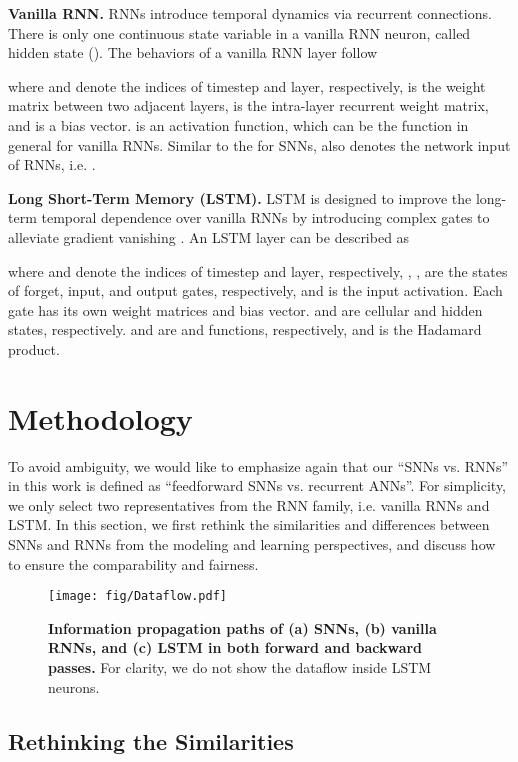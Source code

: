 \documentclass[journal,10pt,twocolumn]{IEEETran}
\begin{document}
\textbf{Vanilla RNN.} RNNs introduce temporal dynamics via recurrent connections. There is only one continuous state variable in a vanilla RNN neuron, called hidden state (). The behaviors of a vanilla RNN layer follow

where  and  denote the indices of timestep and layer, respectively,  is the weight matrix between two adjacent layers,  is the intra-layer recurrent weight matrix, and  is a bias vector.  is an activation function, which can be the  function in general for vanilla RNNs. Similar to the  for SNNs,  also denotes the network input of RNNs, i.e. .

\textbf{Long Short-Term Memory (LSTM).} LSTM is designed to improve the long-term temporal dependence over vanilla RNNs by introducing complex gates to alleviate gradient vanishing \cite{hochreiter1997long,gers1999learning}. An LSTM layer can be described as

where  and  denote the indices of timestep and layer, respectively, , ,  are the states of forget, input, and output gates, respectively, and  is the input activation. Each gate has its own weight matrices and bias vector.  and  are cellular and hidden states, respectively.  and  are  and  functions, respectively, and  is the Hadamard product. \section{Methodology}\label{sec:methodology}

To avoid ambiguity, we would like to emphasize again that our ``SNNs vs. RNNs'' in this work is defined as ``feedforward SNNs vs. recurrent ANNs''. For simplicity, we only select two representatives from the RNN family, i.e. vanilla RNNs and LSTM. In this section, we first rethink the similarities and differences between SNNs and RNNs from the modeling and learning perspectives, and discuss how to ensure the comparability and fairness.

\begin{figure*}[!htbp]
\centering     
\texttt{[image: fig/Dataflow.pdf]}
\vspace{-10pt}
\caption{\textbf{Information propagation paths of (a) SNNs, (b) vanilla RNNs, and (c) LSTM in both forward and backward passes.} For clarity, we do not show the dataflow inside LSTM neurons.}
\label{fig:dataflow} 
\end{figure*}

\subsection{Rethinking the Similarities}
\end{document}

